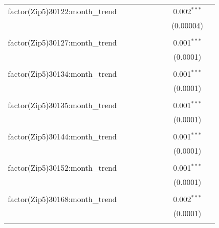 \begin{table}[H]
{\begin{tabular}{@{\extracolsep{5pt}}lcccccccc}
  factor(Zip5)30122:month\_trend &  &  &  &  &  &  & 0.002$^{***}$ &  \\  

   &  &  &  &  &  &  & (0.00004) &  \\  

   & & & & & & & & \\  

  factor(Zip5)30127:month\_trend &  &  &  &  &  &  & 0.001$^{***}$ &  \\  

   &  &  &  &  &  &  & (0.0001) &  \\  

   & & & & & & & & \\  

  factor(Zip5)30134:month\_trend &  &  &  &  &  &  & 0.001$^{***}$ &  \\  

   &  &  &  &  &  &  & (0.0001) &  \\  

   & & & & & & & & \\  

  factor(Zip5)30135:month\_trend &  &  &  &  &  &  & 0.001$^{***}$ &  \\  

   &  &  &  &  &  &  & (0.0001) &  \\  

   & & & & & & & & \\  

  factor(Zip5)30144:month\_trend &  &  &  &  &  &  & 0.001$^{***}$ &  \\  

   &  &  &  &  &  &  & (0.0001) &  \\  

   & & & & & & & & \\  

  factor(Zip5)30152:month\_trend &  &  &  &  &  &  & 0.001$^{***}$ &  \\  

   &  &  &  &  &  &  & (0.0001) &  \\  

   & & & & & & & & \\  

  factor(Zip5)30168:month\_trend &  &  &  &  &  &  & 0.002$^{***}$ &  \\  

   &  &  &  &  &  &  & (0.0001) &  \\  

   & & & & & & & & \\  


\end{tabular}}
\end{table}
